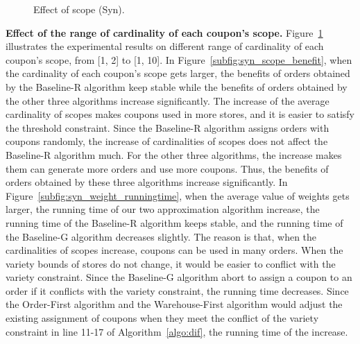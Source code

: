 \begin{figure}[t!]\centering
	\subfigcapskip=-5pt
	\vspace{-2ex}
	\addtocounter{subfigure}{-1}
	\figureCaptionMargin
	\caption{\small Effect of scope (Syn).}\figureBelowMargin
	\label{fig:syn_scope}
\end{figure}

\textbf{Effect of the range of cardinality of each coupon's scope.} Figure~\ref{fig:syn_scope} illustrates the experimental results on different range of cardinality of each coupon's scope, from [1, 2] to [1, 10]. In Figure~\ref{subfig:syn_scope_benefit}, when the cardinality of each coupon's scope gets larger, the benefits of orders obtained by the Baseline-R algorithm keep stable while the benefits of orders obtained by the other three algorithms increase significantly. The increase of the average cardinality of scopes makes coupons used in more stores, and it is easier to satisfy the threshold constraint. Since the Baseline-R algorithm assigns orders with coupons randomly, the increase of cardinalities of scopes does not affect the Baseline-R algorithm much. For the other three algorithms, the increase makes them can generate more orders and use more coupons. Thus, the benefits of orders obtained by these three algorithms increase significantly. In Figure~\ref{subfig:syn_weight_runningtime}, when the average value of weights gets larger, the running time of our two approximation algorithm increase, the running time of the Baseline-R algorithm keeps stable, and the running time of the Baseline-G algorithm decreases slightly. The reason is that, when the cardinalities of scopes increase, coupons can be used in many orders. When the variety bounds of stores do not change, it would be easier to conflict with the variety constraint. Since the Baseline-G algorithm abort to assign a coupon to an order if it conflicts with the variety constraint, the running time decreases. Since the Order-First algorithm and the Warehouse-First algorithm would adjust the existing assignment of coupons when they meet the conflict of the variety constraint in line 11-17 of Algorithm~\ref{algo:dif}, the running time of the increase.

